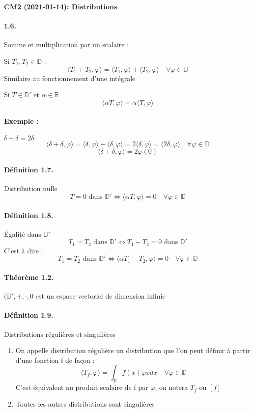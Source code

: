 \documentclass[12pt,a4paper]{report}
\newcommand{\ens}[1]{\mathbb{#1}}
\begin{document}
\begin{center}
\textbf{CM2 (2021-01-14): Distributions}
\end{center}

\paragraph{1.6.} Somme et multiplication par un scalaire :

Si \(T_1, T_2 \in \ens{D}\) :
\[
	\langle T_1 + T_2, \varphi \rangle = \langle T_1, \varphi \rangle + \langle T_2, \varphi \rangle \quad \forall \varphi \in \ens{D}
\]Similaire au fonctionnement d'une intégrale

Si \(T \in \ens{D}' \text{ et } \alpha \in \ens{R}\)
\[
	\langle \alpha T, \varphi \rangle = \alpha \langle T, \varphi \rangle
\]

\paragraph{Exemple :} \(\delta + \delta = 2\delta\)
\[
	\langle \delta + \delta, \varphi \rangle = \langle \delta, \varphi \rangle + \langle \delta, \varphi \rangle = 2 \langle \delta, \varphi \rangle =  \langle 2\delta, \varphi \rangle \quad \forall \varphi \in \ens{D}
\]
\[
	\langle \delta + \delta, \varphi \rangle = 2 \varphi(0)
\]
\paragraph{Définition 1.7.} Distribution nulle
\[
	T = 0 \text{ dans } \ens{D}' \Leftrightarrow \langle \alpha T, \varphi \rangle = 0\quad \forall \varphi \in \ens{D}
\]

\paragraph{Définition 1.8.} Égalité dans \(\ens{D}'\)
\[
	T_1 = T_2 \text{ dans } \ens{D}' \Leftrightarrow T_1 - T_2 = 0 \text{ dans } \ens{D}'
\]
C'est à dire :
\[
	T_1 = T_2 \text{ dans } \ens{D}' \Leftrightarrow \langle \alpha T_1 - T_2, \varphi \rangle = 0\quad \forall \varphi \in \ens{D}
\]

\paragraph{Théorème 1.2.} (\(\ens{D}',+, \cdot, 0\) est un espace vectoriel de dimension infinie

\paragraph{Définition 1.9.} Distributions régulières et singulières
\begin{enumerate}
	\item On appelle distribution régulière un distribution que l'on peut définir à partir d'une fonction f de façon :
	\[
		\langle T_f, \varphi \rangle = \int_{\ens{R}} f(x) \varphi{x} dx \quad \forall \varphi \in \ens{D}
	\]
	C'est équivalent au produit scalaire de f par \(\varphi\), on notera \(T_f\) ou \([f]\)
	\item Toutes les autres distributions sont singulières
\end{enumerate}
\end{document}
